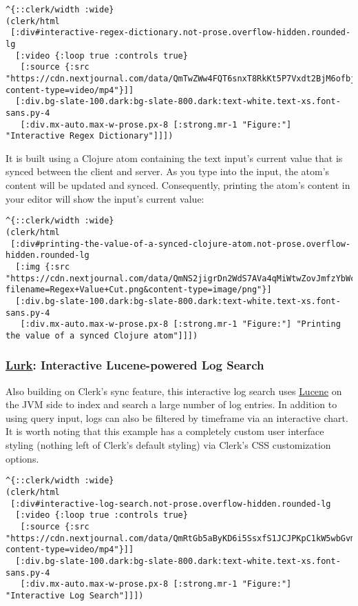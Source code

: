 \documentclass[
]{article}
\begin{document}
\begin{lstlisting}
^{::clerk/width :wide}
(clerk/html
 [:div#interactive-regex-dictionary.not-prose.overflow-hidden.rounded-lg
  [:video {:loop true :controls true}
   [:source {:src "https://cdn.nextjournal.com/data/QmTwZWw4FQT6snxT8RkKt5P7Vxdt2BjM6ofbjKYEcvAZiq?content-type=video/mp4"}]]
  [:div.bg-slate-100.dark:bg-slate-800.dark:text-white.text-xs.font-sans.py-4
   [:div.mx-auto.max-w-prose.px-8 [:strong.mr-1 "Figure:"] "Interactive Regex Dictionary"]]])
\end{lstlisting}

It is built using a Clojure atom containing the text input's current value that is synced between the client and server. As you type into the input, the atom's content will be updated and synced. Consequently, printing the atom's content in your editor will show the input's current value:

\begin{lstlisting}
^{::clerk/width :wide}
(clerk/html
 [:div#printing-the-value-of-a-synced-clojure-atom.not-prose.overflow-hidden.rounded-lg
  [:img {:src "https://cdn.nextjournal.com/data/QmNS2jigrDn2WdS7AVa4qMiWtwZovJmfzYbWczwg1Ptaqk?filename=Regex+Value+Cut.png&content-type=image/png"}]
  [:div.bg-slate-100.dark:bg-slate-800.dark:text-white.text-xs.font-sans.py-4
   [:div.mx-auto.max-w-prose.px-8 [:strong.mr-1 "Figure:"] "Printing the value of a synced Clojure atom"]]])
\end{lstlisting}

\hypertarget{id}{%
\subsubsection{\texorpdfstring{\href{https://github.com/nextjournal/lurk}{Lurk}: Interactive Lucene-powered Log Search}{Lurk: Interactive Lucene-powered Log Search}}\label{id}}

Also building on Clerk's sync feature, this interactive log search uses \href{https://lucene.apache.org/}{Lucene} on the JVM side to index and search a large number of log entries. In addition to using query input, logs can also be filtered by timeframe via an interactive chart. It is worth noting that this example has a completely custom user interface styling (nothing left of Clerk's default styling) via Clerk's CSS customization options.

\begin{lstlisting}
^{::clerk/width :wide}
(clerk/html
 [:div#interactive-log-search.not-prose.overflow-hidden.rounded-lg
  [:video {:loop true :controls true}
   [:source {:src "https://cdn.nextjournal.com/data/QmRtGb5aByKD6i5SsxfS1JCJPKpC1kW5wbGvmT1h6awyB9?content-type=video/mp4"}]]
  [:div.bg-slate-100.dark:bg-slate-800.dark:text-white.text-xs.font-sans.py-4
   [:div.mx-auto.max-w-prose.px-8 [:strong.mr-1 "Figure:"] "Interactive Log Search"]]])
\end{lstlisting}
\end{document}
